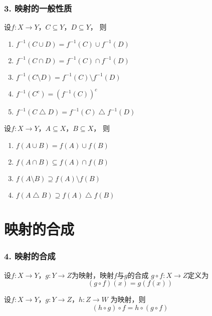 \documentclass{beamer}
\begin{document}
\begin{CJK*}{UTF8}{gbsn}
\begin{frame}
  \frametitle{3. 映射的一般性质}
  \begin{Thm}
    设$f:X\to Y$，$C \subseteq Y$，$D \subseteq Y$， 则
    \begin{enumerate}[(1)]
    \item $f^{-1}(C \cup D) = f^{-1}(C) \cup f^{-1}(D)$
    \item $f^{-1}(C \cap D) = f^{-1}(C) \cap f^{-1}(D)$
    \item $f^{-1}(C \setminus D)=f^{-1}(C) \setminus f^{-1}(D)$
    \item $f^{-1}(C^c) = (f^{-1}(C))^c$
    \item $f^{-1}(C \bigtriangleup D) = f^{-1}(C) \bigtriangleup f^{-1}(D)$
    \end{enumerate}
  \end{Thm}
    \begin{Thm}
    设$f:X\to Y$，$A \subseteq X$，$B \subseteq X$， 则
    \begin{enumerate}[(1)]
    \item $f(A \cup B) = f(A) \cup f(B)$
    \item $f(A \cap B) \subseteq f(A) \cap f(B)$
    \item $f(A \setminus B) \supseteq f(A) \setminus f(B)$
    \item $f(A \bigtriangleup B) \supseteq f(A) \bigtriangleup f(B)$
    \end{enumerate}
  \end{Thm}

\end{frame}

\section{映射的合成}
\begin{frame}
  \frametitle{4. 映射的合成}
  \begin{Def}
    设$f:X\to Y$，$g:Y\to Z$为映射，映射$f$与$g$的\alert{合成} $g\circ f:X\to Z$定义为\[(g\circ f)(x) = g(f(x))\]
  \end{Def}
  \pause
\begin{Thm}
  设$f:X \to Y$，$g:Y\to Z$，$h:Z\to W$ 为映射，则 \[ (h \circ g) \circ f = h \circ (g \circ f) \]
\end{Thm}

\end{frame}


\end{CJK*}
\end{document}
